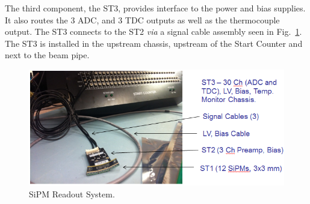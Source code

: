 The third component, the ST3, provides interface to the power and bias supplies.  It also routes the 3 ADC, and 3 TDC outputs as well as the thermocouple output.  The ST3 connects to the ST2 \emph{via} a signal cable assembly seen in Fig.~\ref{fig:SiPM Readout System}.  The ST3 is installed in the upstream chassis, upstream of the Start Counter and next to the beam pipe.
\begin{figure}[!htb]
	\centering
	\includegraphics[width=1.0\columnwidth]{design/figs/SiPM_Readout_System}
	\caption[SiPM Readout System]{SiPM Readout System.}
	\label{fig:SiPM Readout System}
\end{figure}
